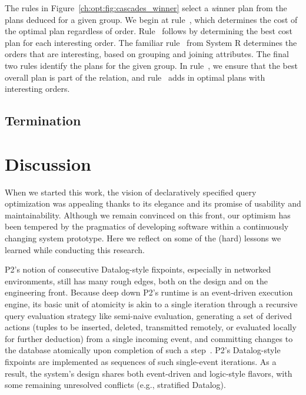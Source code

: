 The rules in Figure~\ref{ch:opt:fig:cascades_winner} select a {\emph winner}
plan from the plans deduced for a given group. We begin at rule~,
which determines the cost of the optimal plan regardless of order. Rule~
follows by determining the best cost plan for each interesting order. The familiar
rule~ from System R determines the orders that are interesting, based
on grouping and joining attributes. The final two rules identify
the  plans for the given group. In rule~, we ensure that
the best overall plan is part of the  relation, and rule~
adds in optimal plans with interesting orders.

\subsection{Termination}
\label{ch:opt:sec:cascadesend}


\section{Discussion}
\label{ch:opt:sec:discussion}

When we started this work, the vision of declaratively specified query
optimization was appealing thanks to its elegance and its promise of usability
and maintainability.  Although we remain convinced on this front, our optimism
has been tempered by the pragmatics of developing software within a
continuously changing system prototype.  Here we reflect on some of the (hard)
lessons we learned while conducting this research.

P2's notion of consecutive Datalog-style fixpoints, especially in networked
environments, still has many rough edges, both on the design and on the
engineering front.  Because deep down P2's runtime is an event-driven execution
engine, its basic unit of atomicity is akin to a single iteration through a
recursive query evaluation strategy like semi-naive evaluation, generating a
set of derived actions (tuples to be inserted, deleted, transmitted remotely,
or evaluated locally for further deduction) from a single incoming event, and
committing changes to the database atomically upon completion of such a
step~\cite{LuThesis}.  P2's Datalog-style fixpoints are implemented as
sequences of such single-event iterations.  As a result, the system's design
shares both event-driven and logic-style flavors, with some remaining
unresolved conflicts (e.g., stratified Datalog).

